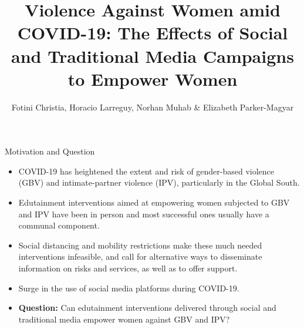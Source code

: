 \documentclass[10pt]{beamer}
\title[Violence amid COVID-19]{Violence Against Women amid COVID-19: The Effects of Social and Traditional Media Campaigns to Empower
Women}
\author[Elizabeth K. Parker-Magyar]{Fotini Christia, Horacio Larreguy, Norhan Muhab \& Elizabeth Parker-Magyar}
\institute[MIT]{Massachusetts Institute of Technology}
\begin{document}
\begin{frame}{}
    \titlepage
\end{frame}

\begin{frame}{Motivation and Question}
\begin{center}
    \begin{itemize}
        \item COVID-19 has heightened the extent and risk of gender-based violence (GBV) and intimate-partner violence (IPV), particularly in the Global South.
        \vspace{5pt}
        \item Edutainment interventions aimed at empowering women subjected to GBV and IPV have been in person and most successful ones usually have a communal component.
        \vspace{5pt}        
        \item Social distancing and mobility restrictions make these much needed interventions infeasible, and call for alternative ways to disseminate information on risks and services, as well as to offer support.
        \vspace{5pt}        
        \item Surge in the use of social media platforms during COVID-19. 
        \vspace{5pt}        
        \item  \textbf{Question:} Can edutainment interventions delivered through social and traditional media empower women against GBV and IPV?
    \end{itemize}
\end{center}
    
\end{frame}
\end{document}
